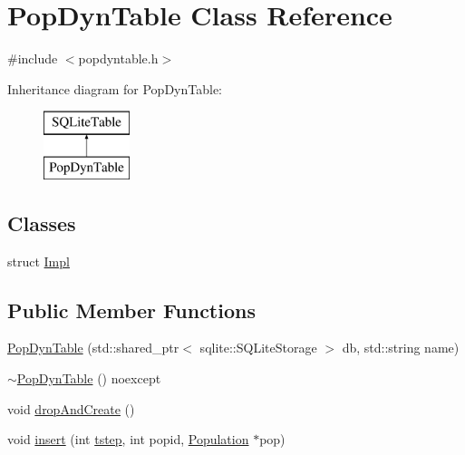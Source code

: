 \hypertarget{class_pop_dyn_table}{}\section{Pop\+Dyn\+Table Class Reference}
\label{class_pop_dyn_table}


{\ttfamily \#include $<$popdyntable.\+h$>$}

Inheritance diagram for Pop\+Dyn\+Table\+:\begin{figure}[H]
\begin{center}
\leavevmode
\includegraphics[height=2.000000cm]{db/d7f/class_pop_dyn_table}
\end{center}
\end{figure}
\subsection*{Classes}
\begin{DoxyCompactItemize}
\item 
struct \mbox{\hyperlink{struct_pop_dyn_table_1_1_impl}{Impl}}
\end{DoxyCompactItemize}
\subsection*{Public Member Functions}
\begin{DoxyCompactItemize}
\item 
\mbox{\hyperlink{class_pop_dyn_table_a3c6b649dde4a86af47b4c0ad66e02fc0}{Pop\+Dyn\+Table}} (std\+::shared\+\_\+ptr$<$ sqlite\+::\+S\+Q\+Lite\+Storage $>$ db, std\+::string name)
\item 
\mbox{\hyperlink{class_pop_dyn_table_ac5a3c3a5c49cd20bb887224a4a4b819e}{$\sim$\+Pop\+Dyn\+Table}} () noexcept
\item 
void \mbox{\hyperlink{class_pop_dyn_table_a05cc504648b685a254f978cb904e37f5}{drop\+And\+Create}} ()
\item 
void \mbox{\hyperlink{class_pop_dyn_table_abb5f086db207701c5a7eb4547666b203}{insert}} (int \mbox{\hyperlink{thread__vessels_8cpp_a84bc73d278de929ec9974e1a95d9b23a}{tstep}}, int popid, \mbox{\hyperlink{class_population}{Population}} $\ast$pop)
\end{DoxyCompactItemize}
